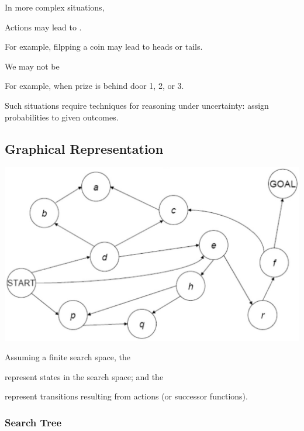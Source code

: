
In more complex situations, 

\begin{listu}
    \item Actions may lead to . 
    
    For example, filpping a coin may lead to heads or tails.

    \item We may not be 
    
    For example, when prize is behind door 1, 2, or 3.

    \item Such situations require techniques for reasoning under uncertainty: assign probabilities to given outcomes.
\end{listu}

\subsection{Graphical Representation}

\begin{center}
    \includegraphics[width=0.5\linewidth]{figures/Search Graph Rep.png}
\end{center}

Assuming a finite search space, the

\begin{listu}
    \item {} represent states in the search space; and the 
    \item {} represent transitions resulting from actions (or successor functions).
\end{listu}

\subsubsection{Search Tree}

